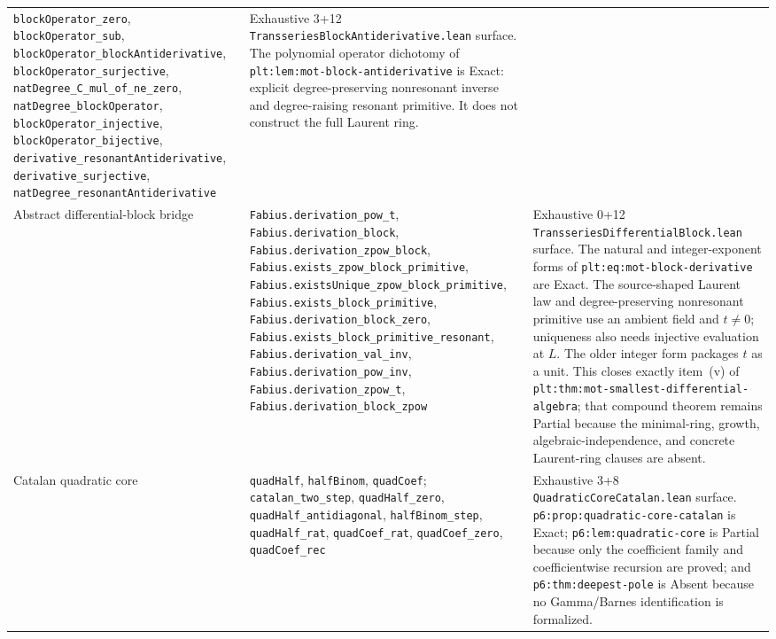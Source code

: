 \documentclass[11pt,oneside]{article}
\theoremstyle{definition}
\theoremstyle{remark}
\begin{document}
\begin{longtable}{@{}>{\raggedright\arraybackslash}p{} >{\raggedright\arraybackslash}p{} >{\raggedright\arraybackslash}p{}@{}}
\nolinkurl{blockOperator_zero}, \nolinkurl{blockOperator_sub},
\nolinkurl{blockOperator_blockAntiderivative},
\nolinkurl{blockOperator_surjective},
\nolinkurl{natDegree_C_mul_of_ne_zero},
\nolinkurl{natDegree_blockOperator}, \nolinkurl{blockOperator_injective},
\nolinkurl{blockOperator_bijective},
\nolinkurl{derivative_resonantAntiderivative},
\nolinkurl{derivative_surjective},
\nolinkurl{natDegree_resonantAntiderivative} & Exhaustive 3+12
\nolinkurl{TransseriesBlockAntiderivative.lean} surface.  The polynomial
operator dichotomy of \nolinkurl{plt:lem:mot-block-antiderivative} is Exact:
explicit degree-preserving nonresonant inverse and degree-raising resonant
primitive.  It does not construct the full Laurent ring. \\
Abstract differential-block bridge &
\nolinkurl{Fabius.derivation_pow_t}, \nolinkurl{Fabius.derivation_block},
\nolinkurl{Fabius.derivation_zpow_block},
\nolinkurl{Fabius.exists_zpow_block_primitive},
\nolinkurl{Fabius.existsUnique_zpow_block_primitive},
\nolinkurl{Fabius.exists_block_primitive},
\nolinkurl{Fabius.derivation_block_zero},
\nolinkurl{Fabius.exists_block_primitive_resonant},
\nolinkurl{Fabius.derivation_val_inv},
\nolinkurl{Fabius.derivation_pow_inv},
\nolinkurl{Fabius.derivation_zpow_t},
\nolinkurl{Fabius.derivation_block_zpow} & Exhaustive
0+12 \nolinkurl{TransseriesDifferentialBlock.lean} surface.  The natural and
integer-exponent forms of \nolinkurl{plt:eq:mot-block-derivative} are Exact.
The source-shaped Laurent law and degree-preserving nonresonant primitive use
an ambient field and \(t\ne0\); uniqueness also needs injective evaluation at
\(L\).  The older integer form packages \(t\) as a unit.  This closes exactly item~(v) of
\nolinkurl{plt:thm:mot-smallest-differential-algebra}; that compound theorem
remains Partial because the minimal-ring, growth, algebraic-independence, and
concrete Laurent-ring clauses are absent. \\
Catalan quadratic core &
\nolinkurl{quadHalf}, \nolinkurl{halfBinom}, \nolinkurl{quadCoef};
\nolinkurl{catalan_two_step}, \nolinkurl{quadHalf_zero},
\nolinkurl{quadHalf_antidiagonal}, \nolinkurl{halfBinom_step},
\nolinkurl{quadHalf_rat}, \nolinkurl{quadCoef_rat},
\nolinkurl{quadCoef_zero}, \nolinkurl{quadCoef_rec} & Exhaustive 3+8
\nolinkurl{QuadraticCoreCatalan.lean} surface.
\nolinkurl{p6:prop:quadratic-core-catalan} is Exact;
\nolinkurl{p6:lem:quadratic-core} is Partial because only the coefficient
family and coefficientwise recursion are proved; and
\nolinkurl{p6:thm:deepest-pole} is Absent because no Gamma/Barnes
identification is formalized. \\

\end{longtable}
\end{document}

